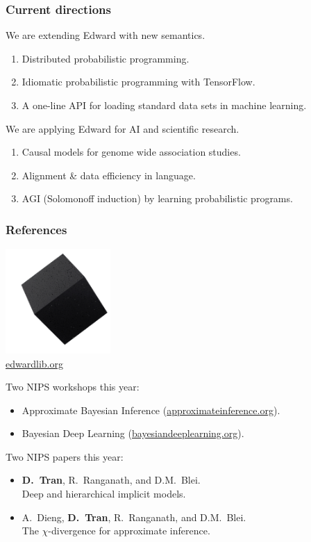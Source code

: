 \documentclass[10pt,
               xcolor={usenames,dvipsnames},
               hyperref={colorlinks,linktoc=all,citecolor=Plum,linkcolor=MidnightBlue,urlcolor=MidnightBlue},noamssymb]{beamer}
\begin{document}
\begin{frame}
\frametitle{Current directions}

We are extending Edward with new semantics.
\begin{enumerate}
\item
Distributed probabilistic programming.
\item
Idiomatic probabilistic programming with TensorFlow.
\item
A one-line API for loading standard data sets in machine learning.
\end{enumerate}
\vspace{3ex}

We are applying Edward for AI and scientific research.
\begin{enumerate}
\item
Causal models for genome wide association studies. 
\item
Alignment \& data efficiency in language.
\item
AGI (Solomonoff induction) by learning probabilistic programs.
\end{enumerate}
\end{frame}

\begin{frame}
\frametitle{References}
\vspace{-1.5ex}
\begin{center}
\includegraphics[width=0.3\textwidth]{img/edward.png}
\\
\large \url{edwardlib.org}
\end{center}
\vspace{1ex}

Two NIPS workshops this year:
\begin{itemize}
\item
Approximate Bayesian Inference
(\url{approximateinference.org}).
\item
Bayesian Deep Learning
(\url{bayesiandeeplearning.org}).
\end{itemize}

Two NIPS papers this year:
\begin{itemize}
\item
\textbf{D.~Tran}, R.~Ranganath, and D.M.~Blei. \\
Deep and hierarchical implicit models. \\
\item
A.~Dieng, \textbf{D.~Tran}, R.~Ranganath, and D.M.~Blei. \\
The $\chi$-divergence for approximate inference. \\
\end{itemize}
\end{frame}
\end{document}
